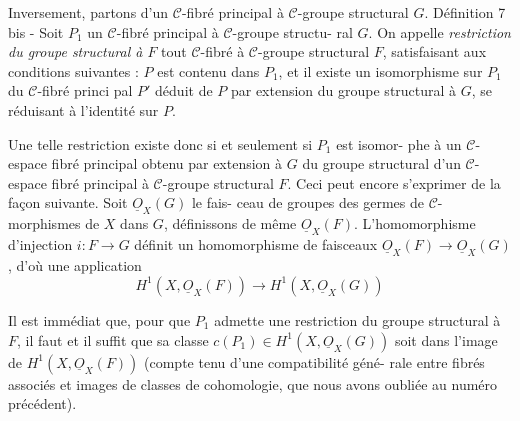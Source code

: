 Inversement, partons d'un $\mathcal{C}$-fibré principal à $\mathcal{C}$-groupe structural $G$.
Définition 7 bis - Soit $P_1$ un $\mathcal{C}$-fibré principal à $\mathcal{C}$-groupe structu-
ral $G$. On appelle \emph{restriction du groupe structural à $F$} tout $\mathcal{C}$-fibré à
$\mathcal{C}$-groupe structural $F$, satisfaisant aux conditions suivantes : $P$ est
contenu dans $P_1$, et il existe un isomorphisme sur $P_1$ du $\mathcal{C}$-fibré princi
pal $P'$ déduit de $P$ par extension du groupe structural à $G$, se réduisant
à l'identité sur $P$.

Une telle restriction existe donc si et seulement si $P_1$ est isomor-
phe à un $\mathcal{C}$-espace fibré principal obtenu par extension à $G$ du groupe
structural d'un $\mathcal{C}$-espace fibré principal à $\mathcal{C}$-groupe structural $F$.
Ceci peut encore s'exprimer de la façon suivante. Soit $\underline{O}_X(G)$ le fais-
ceau de groupes des germes de $\mathcal{C}$-morphismes de $X$ dans $G$, définissons de
même $\underline{O}_X(F)$. L'homomorphisme d'injection $i:F \to G$ définit un homomorphisme
de faisceaux $\underline{O}_X(F) \to \underline{O}_X(G)$, d'où une application
$$ H^1(X, \underline{O}_X(F)) \to H^1(X, \underline{O}_X(G)) $$

\newpage



Il est immédiat que, pour que $P_1$ admette une restriction du groupe
structural à $F$, il faut et il suffit que sa classe $c(P_1) \in H^1(X, \underline{O}_X(G))$
soit dans l'image de $H^1(X, \underline{O}_X(F))$ (compte tenu d'une compatibilité géné-
rale entre fibrés associés et images de classes de cohomologie, que
nous avons oubliée au numéro précédent).

